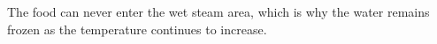 The food can never enter the wet steam area, which is why the water remains frozen as the temperature continues to increase.